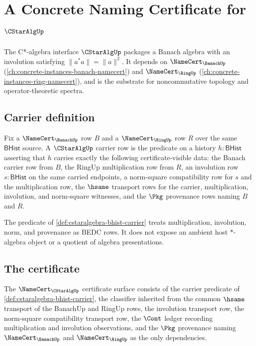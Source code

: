 \chapter{A Concrete Naming Certificate for $\CStarAlgUp$}
\label{ch:concrete-instances-cstaralgebra-namecert}

The C*-algebra interface $\CStarAlgUp$ packages a Banach algebra with an involution satisfying $\|a^* a\| = \|a\|^2$. It depends on $\NameCert_{\BanachUp}$ (\autoref{ch:concrete-instances-banach-namecert}) and $\NameCert_{\RingUp}$ (\autoref{ch:concrete-instances-ring-namecert}), and is the substrate for noncommutative topology and operator-theoretic spectra.

\section{Carrier definition}
\label{sec:cstaralgebra-carrier}

\begin{definition}
\label{def:cstaralgebra-bhist-carrier}
Fix a $\NameCert_{\BanachUp}$ row $B$ and a $\NameCert_{\RingUp}$ row $R$ over the same $\mathsf{BHist}$ source. A $\CStarAlgUp$ carrier row is the predicate on a history $h:\mathsf{BHist}$ asserting that $h$ carries exactly the following certificate-visible data: the Banach carrier row from $B$, the RingUp multiplication row from $R$, an involution row $s:\mathsf{BHist}$ on the same carried endpoints, a norm-square compatibility row for $s$ and the multiplication row, the $\hsame$ transport rows for the carrier, multiplication, involution, and norm-square witnesses, and the $\Pkg$ provenance rows naming $B$ and $R$.
\end{definition}

The predicate of \autoref{def:cstaralgebra-bhist-carrier} treats multiplication, involution, norm, and provenance as BEDC rows. It does not expose an ambient host $*$-algebra object or a quotient of algebra presentations.

\section{The certificate}
\label{sec:cstaralgebra-certificate}

\begin{definition}
\label{def:cstaralgebra-certificate-surface}
The $\NameCert_{\CStarAlgUp}$ certificate surface consists of the carrier predicate of \autoref{def:cstaralgebra-bhist-carrier}, the classifier inherited from the common $\hsame$ transport of the BanachUp and RingUp rows, the involution transport row, the norm-square compatibility transport row, the $\Cont$ ledger recording multiplication and involution observations, and the $\Pkg$ provenance naming $\NameCert_{\BanachUp}$ and $\NameCert_{\RingUp}$ as the only dependencies.
\end{definition}

